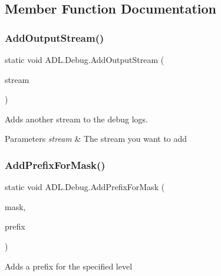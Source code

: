 \subsection{Member Function Documentation}
\mbox{\label{class_a_d_l_1_1_debug_a86b5d2f65724ee112ee9c911f9ce46ae}} 
\subsubsection{\texorpdfstring{Add\+Output\+Stream()}{AddOutputStream()}}
{\footnotesize\ttfamily static void A\+D\+L.\+Debug.\+Add\+Output\+Stream (\begin{DoxyParamCaption}\item[{\mbox{\hyperlink{class_a_d_l_1_1_log_stream}{Log\+Stream}}}]{stream }\end{DoxyParamCaption})\hspace{0.3cm}{\ttfamily [static]}}



Adds another stream to the debug logs. 


\begin{DoxyParams}{Parameters}
{\em stream} & The stream you want to add\\
\hline
\end{DoxyParams}
\mbox{\label{class_a_d_l_1_1_debug_abec71a3a9db52f919e4ba93b6b9842e2}} 
\subsubsection{\texorpdfstring{Add\+Prefix\+For\+Mask()}{AddPrefixForMask()}}
{\footnotesize\ttfamily static void A\+D\+L.\+Debug.\+Add\+Prefix\+For\+Mask (\begin{DoxyParamCaption}\item[{int}]{mask,  }\item[{string}]{prefix }\end{DoxyParamCaption})\hspace{0.3cm}{\ttfamily [static]}}



Adds a prefix for the specified level 



